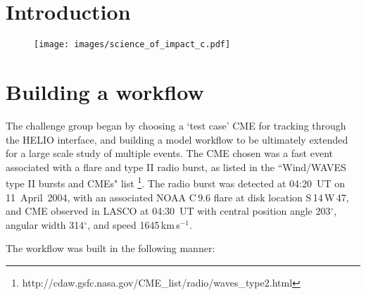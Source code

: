 \documentclass[namedreferences]{SolarPhysics}
\begin{document}
\begin{article}
\begin{opening}
\begin{abstract}
\end{abstract}



%


\end{opening}

%
\section{Introduction}

\begin{figure} 
\centerline{\texttt{[image: images/science\_of\_impact\_c.pdf]}}
\caption{}%
\end{figure}

\section{Building a workflow}

The challenge group began by choosing a `test case' CME for tracking through the HELIO interface, and building a model workflow to be ultimately extended for a large scale study of multiple events. The CME chosen was a fast event associated with a flare and type II radio burst, as listed in the ``Wind/WAVES type II bursts and CMEs" list \footnote{http://cdaw.gsfc.nasa.gov/CME\_list/radio/waves\_type2.html}. The radio burst was detected at 04:20~UT on 11~April~2004, with an associated NOAA C\,9.6 flare at disk location S\,14\,W\,47, and CME observed  in LASCO at 04:30~UT with central position angle 203$^{\circ}$, angular width 314$^{\circ}$, and speed 1645\,km\,s$^{-1}$.

The workflow was built in the following manner:






%



%
  


\end{article}
\end{document}
